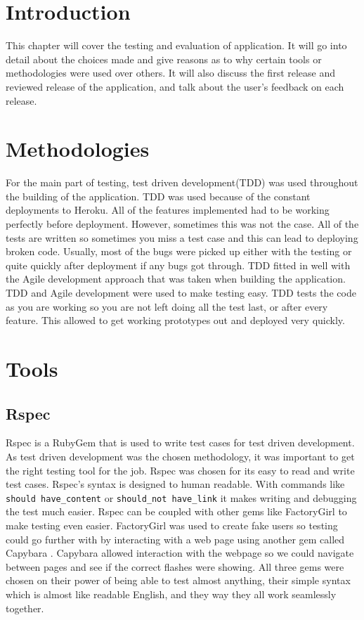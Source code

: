 \section{Introduction}
This chapter will cover the testing and evaluation of application. It will go into detail about the choices made and give reasons as to why certain tools or methodologies were used over others. It will also discuss the first release and reviewed release of the application, and talk about the user's feedback on each release.\\

\section{Methodologies}
For the main part of testing, test driven development(TDD) was used throughout the building of the application. TDD was used because of the constant deployments to Heroku. All of the features implemented had to be working perfectly before deployment. However, sometimes this was not the case. All of the tests are written so sometimes you miss a test case and this can lead to deploying broken code. Usually, most of the bugs were picked up either with the testing or quite quickly after deployment if any bugs got through. TDD fitted in well with the Agile development approach that was taken when building the application. TDD and Agile development were used to make testing easy. TDD tests the code as you are working so you are not left doing all the test last, or after every feature. This allowed to get working prototypes out and deployed very quickly.\\

\section{Tools}
\subsection{Rspec}
Rspec is a RubyGem that is used to write test cases for test driven development. As test driven development was the chosen methodology, it was important to get the right testing tool for the job. Rspec was chosen for its easy to read and write test cases. Rspec's syntax is designed to human readable. With commands like \lstinline{should have_content} or \lstinline{should_not have_link} it makes writing and debugging the test much easier. Rspec can be coupled with other gems like FactoryGirl to make testing even easier. FactoryGirl \citep{factorygirl:2013} was used to create fake users so testing could go further with by interacting with a web page using another gem called Capybara \citep{capybara:2013}. Capybara allowed interaction with the webpage so we could navigate between pages and see if the correct flashes were showing. All three gems were chosen on their power of being able to test almost anything, their simple syntax which is almost like readable English, and they way they all work seamlessly together.

